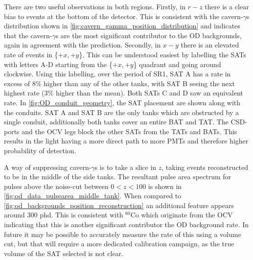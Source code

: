 

\par
There are two useful observations in both regions.
Firstly, in $r-z$ there is a clear bias to events at the bottom of the detector.
This is consistent with the cavern-$\gamma$s distribution shown in \autoref{fig:cavern_gamma_position_distribution} and indicates that the cavern-$\gamma$s are the most significant contributor to the OD backgrounds, again in agreement with the prediction.
Secondly, in $x-y$ there is an elevated rate of events in \{$+x,+y$\}.
This can be understood easiest by labelling the SATs with letters A-D starting from the \{$+x,+y$\} quadrant and going around clockwise.
Using this labelling, over the period of SR1, SAT A has a rate in excess of 8\% higher than any of the other tanks, with SAT B seeing the next highest rate (3\% higher than the mean).
Both SATs C and D saw an equivalent rate.
In \autoref{fig:OD_conduit_geometry}, the SAT placement are shown along with the conduits.
SAT A and SAT B are the only tanks which are obstructed by a single conduit, additionally both tanks cover an entire BAT and TAT.
The CSD-ports and the OCV legs block the other SATs from the TATs and BATs.
This results in the light having a more direct path to more PMTs and therefore higher probability of detection.
\par
A way of suppressing cavern-$\gamma$s is to take a slice in $z$, taking events reconstructed to be in the middle of the side tanks.
The resultant pulse area spectrum for pulses above the noise-cut between $0<z<100$ is shown in \autoref{fig:od_data_pulsearea_middle_tank}.
When compared to \autoref{fig:od_backgrounds_position_reconstruction} an additional feature appears around 300 phd.
This is consistent with ${}^{60}$Co which originate from the OCV indicating that this is another significant contributor the OD background rate.
In future it may be possible to accurately measure the rate of this using a volume cut, but that will require a more dedicated calibration campaign, as the true volume of the SAT selected is not clear.

